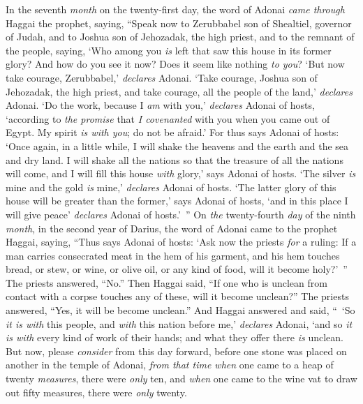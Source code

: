 \begin{biblechapter} %
 In the seventh \textit{month} on the twenty-first day, the word of Adonai \textit{came through} Haggai the prophet, saying,
\verse “Speak now to Zerubbabel son of Shealtiel, governor of Judah, and to Joshua son of Jehozadak, the high priest, and to the remnant of the people, saying,
\verse ‘Who among you \textit{is} left that saw this house in its former glory? And how do you see it now? Does it seem like nothing \textit{to you}?
\verse ‘But now take courage, Zerubbabel,’ \textit{declares} Adonai. ‘Take courage, Joshua son of Jehozadak, the high priest, and take courage, all the people of the land,’ \textit{declares} Adonai. ‘Do the work, because I \textit{am} with you,’ \textit{declares} Adonai of hosts,
\verse ‘according to \textit{the promise} that \textit{I covenanted} with you when you came out of Egypt. My spirit \textit{is with you}; do not be afraid.’
\verse For thus says Adonai of hosts: ‘Once again, in a little while, I will shake the heavens and the earth and the sea and dry land.
\verse I will shake all the nations so that the treasure of all the nations will come, and I will fill this house \textit{with} glory,’ says Adonai of hosts.
\verse ‘The silver \textit{is} mine and the gold \textit{is} mine,’ \textit{declares} Adonai of hosts.
\verse ‘The latter glory of this house will be greater than the former,’ says Adonai of hosts, ‘and in this place I will give peace’ \textit{declares} Adonai of hosts.’ ”
\verse On \textit{the} twenty-fourth \textit{day} of the ninth \textit{month}, in the second year of Darius, the word of Adonai came to the prophet Haggai, saying,
\verse “Thus says Adonai of hosts: ‘Ask now the priests \textit{for} a ruling:
\verse If a man carries consecrated meat in the hem of his garment, and his hem touches bread, or stew, or wine, or olive oil, or any kind of food, will it become holy?’ ” The priests answered, “No.”
\verse Then Haggai said, “If one who is unclean from contact with a corpse touches any of these, will it become unclean?” The priests answered, “Yes, it will be become unclean.”
\verse And Haggai answered and said, “ ‘So \textit{it is with} this people, and \textit{with} this nation before me,’ \textit{declares} Adonai, ‘and so \textit{it is with} every kind of work of their hands; and what they offer there \textit{is} unclean.
\verse But now, please \textit{consider} from this day forward, before one stone was placed on another in the temple of Adonai,
\verse \textit{from that time when} one came to a heap of twenty \textit{measures}, there were \textit{only} ten, and \textit{when} one came to the wine vat to draw out fifty measures, there were \textit{only} twenty.

\end{biblechapter}
